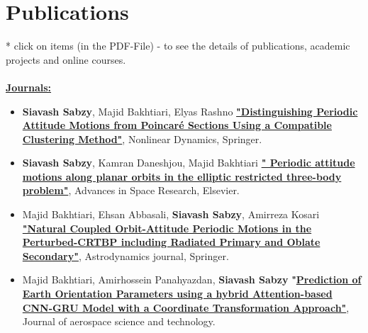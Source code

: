 \documentclass[11pt,a4paper, sans]{moderncv}
\begin{document}
\section{Publications}
* \footnotesize click on items (in the PDF-File) - to see the details of publications, academic projects and online courses. \\
\normalsize \\
\textbf{\underline{\href{https://scholar.google.com/citations?user=pz4gpScAAAAJ&hl=en}{Journals:}}}
\begin{itemize}
\item \textbf{Siavash Sabzy}, Majid Bakhtiari, Elyas Rashno 
\textbf{\href{https://link.springer.com/article/10.1007/s11071-024-09288-2}{"Distinguishing Periodic Attitude Motions from Poincaré Sections Using a Compatible Clustering Method"}}, Nonlinear Dynamics, Springer.
\vspace{5pt}
\item \textbf{Siavash Sabzy}, Kamran Daneshjou, Majid Bakhtiari 
 \textbf{\href{https://doi.org/10.1016/j.asr.2021.01.019}{" Periodic attitude motions along planar orbits in the elliptic restricted three-body problem"}}, Advances in Space Research, Elsevier.
 \vspace{5pt}
 \item  Majid Bakhtiari, Ehsan Abbasali, \textbf{Siavash Sabzy}, Amirreza Kosari 
 \textbf{\href{https://link.springer.com/article/10.1007/s42064-022-0154-0}{"Natural Coupled Orbit-Attitude Periodic Motions in the Perturbed-CRTBP including Radiated Primary and Oblate Secondary"}}, Astrodynamics journal, Springer. 
 \vspace{5pt}
 \item Majid Bakhtiari, Amirhossein Panahyazdan, \textbf{Siavash Sabzy}
 \textbf{"\href{https://doi.org/10.22034/jast.2024.442700.1174}{Prediction of Earth Orientation Parameters using a hybrid Attention-based CNN-GRU Model with a Coordinate Transformation Approach"}}, Journal of aerospace science and technology. \\ \\

\end{itemize}
\end{document}
